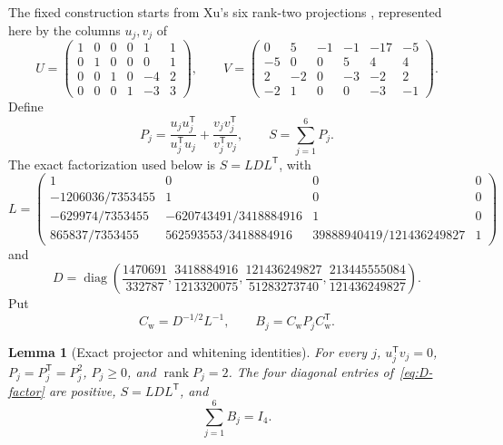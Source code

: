 \documentclass[12pt]{article}
\newtheorem{lemma}[theorem]{Lemma}
\theoremstyle{definition}
\theoremstyle{remark}
\newcommand{\rank}{\operatorname{rank}}
\begin{document}
The fixed construction starts from Xu's six rank-two projections
\cite[Theorem~4.2]{Xu2018}, represented here by the columns $u_j,v_j$ of
\begin{equation}\label{eq:exact-uv}
U=\begin{pmatrix}
1&0&0&0&1&1\\
0&1&0&0&0&1\\
0&0&1&0&-4&2\\
0&0&0&1&-3&3
\end{pmatrix},\qquad
V=\begin{pmatrix}
0&5&-1&-1&-17&-5\\
-5&0&0&5&4&4\\
2&-2&0&-3&-2&2\\
-2&1&0&0&-3&-1
\end{pmatrix}.
\end{equation}
Define
\begin{equation}\label{eq:projectors}
 P_j=\frac{u_ju_j^\mathsf T}{u_j^\mathsf Tu_j}
     +\frac{v_jv_j^\mathsf T}{v_j^\mathsf Tv_j},
\qquad S=\sum_{j=1}^6P_j.
\end{equation}
The exact factorization used below is $S=LDL^\mathsf T$, with
\begin{equation}\label{eq:L-factor}
L=\begin{pmatrix}
1&0&0&0\\
-1206036/7353455&1&0&0\\
-629974/7353455&-620743491/3418884916&1&0\\
865837/7353455&562593553/3418884916&
39888940419/121436249827&1
\end{pmatrix}
\end{equation}
and
\begin{equation}\label{eq:D-factor}
D=\operatorname{diag}\!\left(
\frac{1470691}{332787},
\frac{3418884916}{1213320075},
\frac{121436249827}{51283273740},
\frac{213445555084}{121436249827}
\right).
\end{equation}
Put
\begin{equation}\label{eq:whitening}
 C_{\mathrm w}=D^{-1/2}L^{-1},\qquad
 B_j=C_{\mathrm w}P_jC_{\mathrm w}^{\mathsf T}.
\end{equation}

\begin{lemma}[Exact projector and whitening identities]\label{lem:projectors}
\label{lem:whitening}
For every $j$, $u_j^\mathsf Tv_j=0$, $P_j=P_j^\mathsf T=P_j^2$,
$P_j\ge0$, and $\rank P_j=2$.  The four diagonal entries of~\eqref{eq:D-factor}
are positive, $S=LDL^\mathsf T$, and
\begin{equation}\label{eq:tight-sum}
 \sum_{j=1}^6B_j=I_4.
\end{equation}
\end{lemma}
\end{document}
